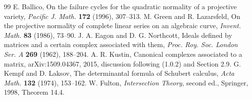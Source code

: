 \begin{thebibliography}{99}
 E. Ballico, On the failure cycles for the quadratic normality of a projective variety, \emph{Pacific J. Math.} \textbf{172} (1996), 307--313.
 M. Green and R. Lazarsfeld, On the projective normality of complete linear series on an algebraic curve, \emph{Invent. Math.} \textbf{83} (1986), 73--90.
 J. A. Eagon and D. G. Northcott, Ideals defined by matrices and a certain complex associated with them, \emph{Proc. Roy. Soc. London Ser. A} \textbf{269} (1962), 188--204.
 A. R. Kustin, Canonical complexes associated to a matrix, arXiv:1509.04367, 2015, discussion following (1.0.2) and Section 2.9.
 G. Kempf and D. Laksov, The determinantal formula of Schubert calculus, \emph{Acta Math.} \textbf{132} (1974), 153--162.
 W. Fulton, \emph{Intersection Theory}, second ed., Springer, 1998, Theorem 14.4.
\end{thebibliography}
